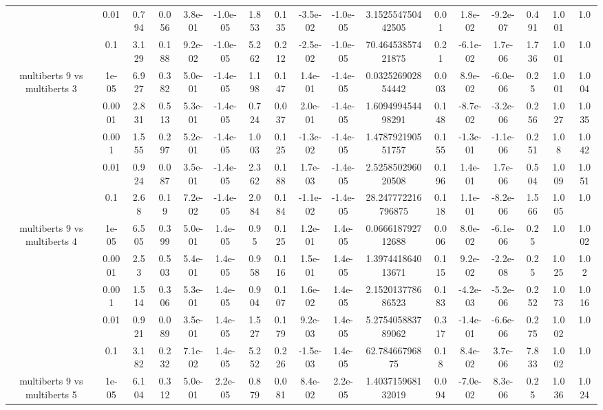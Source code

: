 \begin{tabular}{|c|c|c|c|c|c|c|c|c|c|c|c|c|c|c|c|c|}
 & 0.01 & 0.794 & 0.056 & 3.8e-01 & -1.0e-05 & 1.853 & 0.135 & -3.5e-02 & -1.0e-05 & 3.152554750442505 & 0.01 & 1.8e-02 & -9.2e-07 & 0.491 & 1.001 & 1.0 \\
 & 0.1 & 3.129 & 0.188 & 9.2e-02 & -1.0e-05 & 5.262 & 0.212 & -2.5e-02 & -1.0e-05 & 70.46453857421875 & 0.21 & -6.1e-02 & 1.7e-06 & 1.736 & 1.001 & 1.0 \\
\hline
\multirow{5}{*}{multiberts 9 vs multiberts 3} & 1e-05 & 6.927 & 0.382 & 5.0e-01 & -1.4e-05 & 1.198 & 0.147 & 1.4e-01 & -1.4e-05 & 0.032526902854442 & 0.003 & 8.9e-02 & -6.0e-06 & 0.25 & 1.001 & 1.004 \\
 & 0.0001 & 2.831 & 0.513 & 5.3e-01 & -1.4e-05 & 0.724 & 0.037 & 2.0e-01 & -1.4e-05 & 1.609499454498291 & 0.148 & -8.7e-02 & -3.2e-06 & 0.256 & 1.027 & 1.035 \\
 & 0.001 & 1.555 & 0.297 & 5.2e-01 & -1.4e-05 & 1.003 & 0.125 & -1.3e-02 & -1.4e-05 & 1.478792190551757 & 0.155 & -1.3e-01 & -1.1e-06 & 0.251 & 1.08 & 1.042 \\
 & 0.01 & 0.924 & 0.087 & 3.5e-01 & -1.4e-05 & 2.362 & 0.188 & 1.7e-03 & -1.4e-05 & 2.525850296020508 & 0.196 & 1.4e-01 & 1.7e-06 & 0.504 & 1.009 & 1.051 \\
 & 0.1 & 2.68 & 0.19 & 7.2e-02 & -1.4e-05 & 2.084 & 0.184 & -1.1e-02 & -1.4e-05 & 28.247772216796875 & 0.118 & 1.1e-01 & -8.2e-06 & 1.566 & 1.005 & 1.0 \\
\hline
\multirow{5}{*}{multiberts 9 vs multiberts 4} & 1e-05 & 6.505 & 0.399 & 5.0e-01 & 1.4e-05 & 0.95 & 0.125 & 1.2e-01 & 1.4e-05 & 0.066618792712688 & 0.006 & 8.0e-02 & -6.1e-06 & 0.25 & 1.0 & 1.002 \\
 & 0.0001 & 2.53 & 0.503 & 5.4e-01 & 1.4e-05 & 0.958 & 0.116 & 1.5e-01 & 1.4e-05 & 1.397441864013671 & 0.115 & 9.2e-02 & -2.2e-08 & 0.25 & 1.025 & 1.02 \\
 & 0.001 & 1.514 & 0.306 & 5.3e-01 & 1.4e-05 & 0.904 & 0.107 & 1.6e-02 & 1.4e-05 & 2.152013778686523 & 0.183 & -4.2e-03 & -5.2e-06 & 0.252 & 1.073 & 1.016 \\
 & 0.01 & 0.921 & 0.089 & 3.5e-01 & 1.4e-05 & 1.527 & 0.179 & 9.2e-03 & 1.4e-05 & 5.275405883789062 & 0.317 & -1.4e-01 & -6.6e-06 & 0.275 & 1.002 & 1.0 \\
 & 0.1 & 3.182 & 0.232 & 7.1e-02 & 1.4e-05 & 5.252 & 0.226 & -1.5e-03 & 1.4e-05 & 62.78466796875 & 0.18 & 8.4e-02 & 3.7e-06 & 7.833 & 1.002 & 1.0 \\
\hline
\multirow{5}{*}{multiberts 9 vs multiberts 5} & 1e-05 & 6.104 & 0.312 & 5.0e-01 & 2.2e-05 & 0.879 & 0.081 & 8.4e-02 & 2.2e-05 & 1.403715968132019 & 0.094 & -7.0e-02 & 8.3e-06 & 0.25 & 1.036 & 1.024 \\

\end{tabular}
